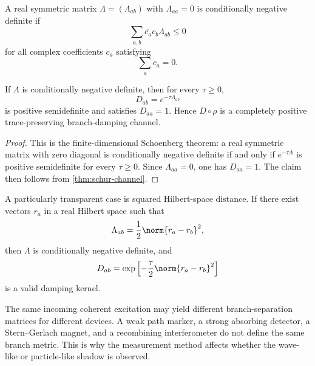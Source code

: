 \documentclass[11pt]{article}
\newcommand{\Meas}{\mathsf M}
\begin{document}
\begin{definition}
\label{def:cnd}
A real symmetric matrix \(\Lambda=(\Lambda_{ab})\) with \(\Lambda_{aa}=0\) is conditionally
negative definite if
\begin{equation}
  \sum_{a,b}\overline{c_a}c_b\Lambda_{ab}\le0
  \label{eq:cnd-condition}
\end{equation}
for all complex coefficients \(c_a\) satisfying
\begin{equation}
  \sum_a c_a=0.
\end{equation}
\end{definition}

\begin{proposition}
\label{prop:schoenberg}
If \(\Lambda\) is conditionally negative definite, then for every \(\tau\ge0\),
\begin{equation}
  D_{ab}=e^{-\tau\Lambda_{ab}}
\end{equation}
is positive semidefinite and satisfies \(D_{aa}=1\). Hence \(D\circ\rho\) is a completely
positive trace-preserving branch-damping channel.
\end{proposition}

\begin{proof}
This is the finite-dimensional Schoenberg theorem: a real symmetric matrix with zero
diagonal is conditionally negative definite if and only if \(e^{-\tau\Lambda}\) is positive
semidefinite for every \(\tau\ge0\). Since \(\Lambda_{aa}=0\), one has \(D_{aa}=1\). The
claim then follows from \cref{thm:schur-channel}.
\end{proof}

A particularly transparent case is squared Hilbert-space distance. If there exist vectors
\(r_a\) in a real Hilbert space such that
\begin{equation}
  \Lambda_{ab}
  =
  \frac12\norm{r_a-r_b}^2,
  \label{eq:squared-distance-Lambda}
\end{equation}
then \(\Lambda\) is conditionally negative definite, and
\begin{equation}
  D_{ab}
  =
  \exp\left[
  -\frac{\tau}{2}\norm{r_a-r_b}^2
  \right]
  \label{eq:gaussian-branch-damping}
\end{equation}
is a valid damping kernel.

\begin{remark}[Device dependence of \(\Lambda_{ab}^{(\Meas)}\)]
\label{rem:device-dependence-lambda}
The same incoming coherent excitation may yield different branch-separation matrices for
different devices. A weak path marker, a strong absorbing detector, a Stern--Gerlach magnet,
and a recombining interferometer do not define the same branch metric. This is why the
measurement method affects whether the wave-like or particle-like shadow is observed.
\end{remark}
\end{document}
